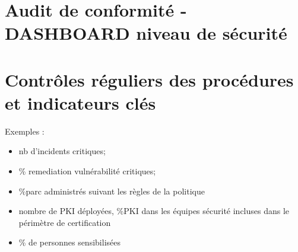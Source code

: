 
\section{Audit de conformité - DASHBOARD niveau de sécurité}
\section{Contrôles réguliers des procédures et indicateurs clés}
Exemples : 
\begin{itemize}
    \item nb d’incidents critiques;
    \item \% remediation vulnérabilité critiques;
    \item \%parc administrés suivant les règles de la politique
    \item nombre de PKI déployées, \%PKI dans les équipes sécurité incluses dans le périmètre de certification
    \item \% de personnes sensibilisées
\end{itemize}
